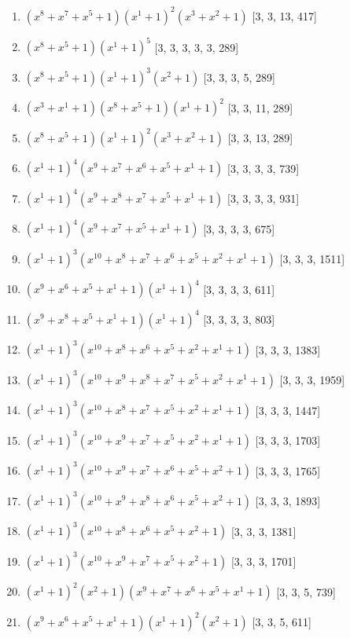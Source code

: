 \documentclass[10pt,twocolumn]{article}
\begin{document}
\begin{enumerate}
\item $(x^{8} + x^{7} + x^{5} + 1)(x^{1} + 1)^{2}(x^{3} + x^{2} + 1)$  [3, 3, 13, 417]
\item $(x^{8} + x^{5} + 1)(x^{1} + 1)^{5}$  [3, 3, 3, 3, 3, 289]
\item $(x^{8} + x^{5} + 1)(x^{1} + 1)^{3}(x^{2} + 1)$  [3, 3, 3, 5, 289]
\item $(x^{3} + x^{1} + 1)(x^{8} + x^{5} + 1)(x^{1} + 1)^{2}$  [3, 3, 11, 289]
\item $(x^{8} + x^{5} + 1)(x^{1} + 1)^{2}(x^{3} + x^{2} + 1)$  [3, 3, 13, 289]
\item $(x^{1} + 1)^{4}(x^{9} + x^{7} + x^{6} + x^{5} + x^{1} + 1)$  [3, 3, 3, 3, 739]
\item $(x^{1} + 1)^{4}(x^{9} + x^{8} + x^{7} + x^{5} + x^{1} + 1)$  [3, 3, 3, 3, 931]
\item $(x^{1} + 1)^{4}(x^{9} + x^{7} + x^{5} + x^{1} + 1)$  [3, 3, 3, 3, 675]
\item $(x^{1} + 1)^{3}(x^{10} + x^{8} + x^{7} + x^{6} + x^{5} + x^{2} + x^{1} + 1)$  [3, 3, 3, 1511]
\item $(x^{9} + x^{6} + x^{5} + x^{1} + 1)(x^{1} + 1)^{4}$  [3, 3, 3, 3, 611]
\item $(x^{9} + x^{8} + x^{5} + x^{1} + 1)(x^{1} + 1)^{4}$  [3, 3, 3, 3, 803]
\item $(x^{1} + 1)^{3}(x^{10} + x^{8} + x^{6} + x^{5} + x^{2} + x^{1} + 1)$  [3, 3, 3, 1383]
\item $(x^{1} + 1)^{3}(x^{10} + x^{9} + x^{8} + x^{7} + x^{5} + x^{2} + x^{1} + 1)$  [3, 3, 3, 1959]
\item $(x^{1} + 1)^{3}(x^{10} + x^{8} + x^{7} + x^{5} + x^{2} + x^{1} + 1)$  [3, 3, 3, 1447]
\item $(x^{1} + 1)^{3}(x^{10} + x^{9} + x^{7} + x^{5} + x^{2} + x^{1} + 1)$  [3, 3, 3, 1703]
\item $(x^{1} + 1)^{3}(x^{10} + x^{9} + x^{7} + x^{6} + x^{5} + x^{2} + 1)$  [3, 3, 3, 1765]
\item $(x^{1} + 1)^{3}(x^{10} + x^{9} + x^{8} + x^{6} + x^{5} + x^{2} + 1)$  [3, 3, 3, 1893]
\item $(x^{1} + 1)^{3}(x^{10} + x^{8} + x^{6} + x^{5} + x^{2} + 1)$  [3, 3, 3, 1381]
\item $(x^{1} + 1)^{3}(x^{10} + x^{9} + x^{7} + x^{5} + x^{2} + 1)$  [3, 3, 3, 1701]
\item $(x^{1} + 1)^{2}(x^{2} + 1)(x^{9} + x^{7} + x^{6} + x^{5} + x^{1} + 1)$  [3, 3, 5, 739]
\item $(x^{9} + x^{6} + x^{5} + x^{1} + 1)(x^{1} + 1)^{2}(x^{2} + 1)$  [3, 3, 5, 611]

\end{enumerate}
\end{document}
